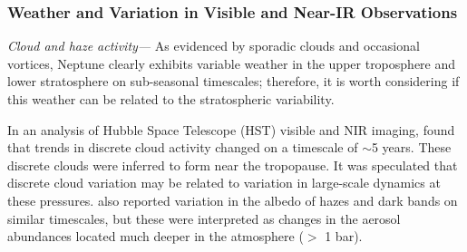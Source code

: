 \documentclass[twocolumn,10pt]{aastex631}
\begin{document}


\subsubsection{Weather and Variation in Visible and Near-IR Observations}

\emph{Cloud and haze activity---} As evidenced by sporadic clouds and occasional vortices, Neptune clearly exhibits variable weather in the upper troposphere and lower stratosphere on sub-seasonal timescales; therefore, it is worth considering if this weather can be related to the stratospheric variability. 

In an analysis of Hubble Space Telescope (HST) visible and NIR imaging, \citet{karkoschka2011neptune} found that trends in discrete cloud activity changed on a timescale of $\sim$5 years.  These discrete clouds were inferred to form near the tropopause. It was speculated that discrete cloud variation may be related to variation in large-scale dynamics at these pressures. \citet{karkoschka2011neptune} also reported variation in the albedo of hazes and dark bands on similar timescales, but these were interpreted as changes in the aerosol abundances located much deeper in the atmosphere ($>$ 1 bar). 
\end{document}

